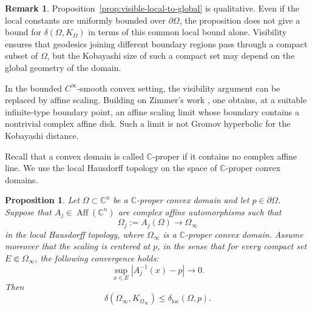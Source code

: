 \documentclass[11pt]{article}
\newtheorem{proposition}[theorem]{Proposition}
\theoremstyle{definition}
\newtheorem{remark}[theorem]{Remark}
\newcommand{\C}{\mathbb{C}}
\begin{document}
\begin{remark}
Proposition~\ref{prop:visible-local-to-global} is qualitative.  Even if
the local constants are uniformly bounded over
\(\partial\Omega\), the proposition does not give a bound for
\(\delta(\Omega,K_\Omega)\) in terms of this common local bound alone.
Visibility ensures that geodesics joining different boundary regions
pass through a compact subset of \(\Omega\), but the Kobayashi size of
such a compact set may depend on the global geometry of the domain.
\end{remark}
In the bounded \(C^\infty\)-smooth convex setting, the visibility
argument can be replaced by affine scaling.  Building on Zimmer's work
\cite{ZimmerFiniteType}, one obtains, at a suitable infinite-type
boundary point, an affine scaling limit whose boundary contains a
nontrivial complex affine disk.  Such a limit is not Gromov hyperbolic
for the Kobayashi distance.

Recall that a convex domain is called \(\C\)-proper if it contains no complex
affine line.  We use the local Hausdorff topology on the space
of \(\C\)-proper convex domains.

\begin{proposition}
	\label{prop:local-constant-scaling-limit}
	Let \(\Omega\subset\C^n\) be a \(\C\)-proper convex domain and let
	\(p\in\partial\Omega\).  Suppose that
	\(A_j\in\operatorname{Aff}(\C^n)\) are complex affine automorphisms such
	that
	\[
	\Omega_j:=A_j(\Omega)\longrightarrow\Omega_\infty
	\]
	in the local Hausdorff topology, where \(\Omega_\infty\) is a
	\(\C\)-proper convex domain.  Assume moreover that the scaling is
	centered at \(p\), in the sense that for every compact set
	\(E\Subset\Omega_\infty\), the following convergence holds:
	\begin{equation*}
		\sup_{x\in E}|A_j^{-1}(x)-p|
		\longrightarrow0.
	\end{equation*}
	Then
	\[
	\delta(\Omega_\infty,K_{\Omega_\infty})
	\le
	\delta_{\mathrm{loc}}(\Omega,p).
	\]
\end{proposition}
\end{document}
